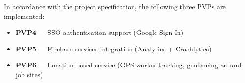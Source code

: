 In accordance with the project specification, the following three PVPs are implemented:

\begin{itemize}
  \item \textbf{PVP4} --- SSO authentication support (Google Sign-In)
  \item \textbf{PVP5} --- Firebase services integration (Analytics + Crashlytics)
  \item \textbf{PVP6} --- Location-based service (GPS worker tracking, geofencing around job sites)
\end{itemize}